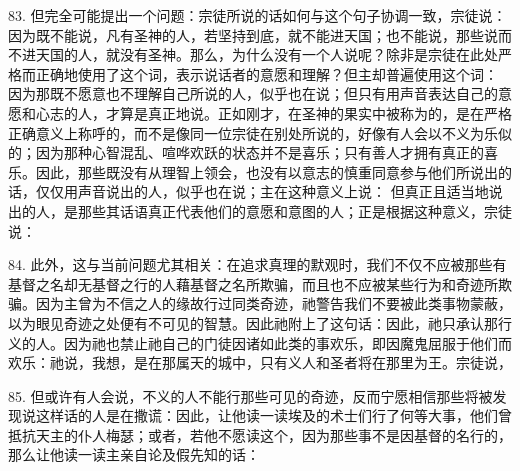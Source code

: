83. 但完全可能提出一个问题：宗徒所说的话如何与这个句子协调一致，宗徒说： 因为既不能说，凡有圣神的人，若坚持到底，就不能进天国；也不能说，那些说而不进天国的人，就没有圣神。那么，为什么没有一个人说呢？除非是宗徒在此处严格而正确地使用了这个词，表示说话者的意愿和理解？但主却普遍使用这个词： 因为那既不愿意也不理解自己所说的人，似乎也在说；但只有用声音表达自己的意愿和心志的人，才算是真正地说。正如刚才，在圣神的果实中被称为的，是在严格正确意义上称呼的，而不是像同一位宗徒在别处所说的，好像有人会以不义为乐似的；因为那种心智混乱、喧哗欢跃的状态并不是喜乐；只有善人才拥有真正的喜乐。因此，那些既没有从理智上领会，也没有以意志的慎重同意参与他们所说出的话，仅仅用声音说出的人，似乎也在说；主在这种意义上说： 但真正且适当地说出的人，是那些其话语真正代表他们的意愿和意图的人；正是根据这种意义，宗徒说：\par

84. 此外，这与当前问题尤其相关：在追求真理的默观时，我们不仅不应被那些有基督之名却无基督之行的人藉基督之名所欺骗，而且也不应被某些行为和奇迹所欺骗。因为主曾为不信之人的缘故行过同类奇迹，祂警告我们不要被此类事物蒙蔽，以为眼见奇迹之处便有不可见的智慧。因此祂附上了这句话：因此，祂只承认那行义的人。因为祂也禁止祂自己的门徒因诸如此类的事欢乐，即因魔鬼屈服于他们而欢乐：祂说，我想，是在那属天的城中，只有义人和圣者将在那里为王。宗徒说，\par

85. 但或许有人会说，不义的人不能行那些可见的奇迹，反而宁愿相信那些将被发现说这样话的人是在撒谎：因此，让他读一读埃及的术士们行了何等大事，他们曾抵抗天主的仆人梅瑟；或者，若他不愿读这个，因为那些事不是因基督的名行的，那么让他读一读主亲自论及假先知的话：\par

